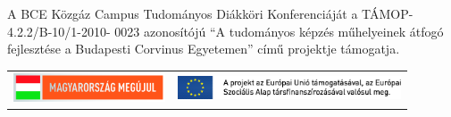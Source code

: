 \vspace{0.8cm}
A BCE Közgáz Campus Tudományos Diákköri Konferenciáját a TÁMOP-4.2.2/B-10/1-2010-
0023 azonosítójú  “A tudományos képzés műhelyeinek átfogó fejlesztése a Budapesti 
Corvinus Egyetemen” című projektje támogatja.

\vspace{1.8cm}

\begin{tabularx}{\textwidth}{lr}
	\includegraphics[width=170px]{assets/megujul.png} & \includegraphics[width=250px]{assets/eutam.png}
\end{tabularx}



\clearpage











